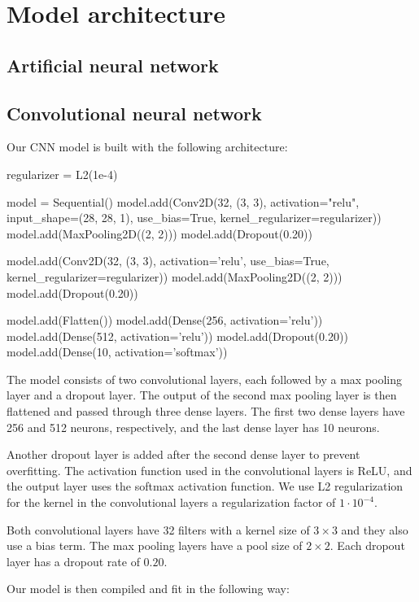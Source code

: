 \section{Model architecture}

\subsection{Artificial neural network}

\subsection{Convolutional neural network}

Our CNN model is built with the following architecture:

\begin{python}
regularizer = L2(1e-4)

model = Sequential()
model.add(Conv2D(32, (3, 3), activation="relu", input_shape=(28, 28, 1), use_bias=True, kernel_regularizer=regularizer))
model.add(MaxPooling2D((2, 2)))
model.add(Dropout(0.20))

model.add(Conv2D(32, (3, 3), activation='relu', use_bias=True, kernel_regularizer=regularizer))
model.add(MaxPooling2D((2, 2)))
model.add(Dropout(0.20))

model.add(Flatten())
model.add(Dense(256, activation='relu'))
model.add(Dense(512, activation='relu'))
model.add(Dropout(0.20))
model.add(Dense(10, activation='softmax'))
\end{python}

The model consists of two convolutional layers, each followed by a max pooling layer and a dropout layer. The output of the second max pooling layer is then flattened and passed through three dense layers. The first two dense layers have 256 and 512 neurons, respectively, and the last dense layer has 10 neurons. 
\par
Another dropout layer is added after the second dense layer to prevent overfitting. The activation function used in the convolutional layers is ReLU, and the output layer uses the softmax activation function. We use L2 regularization for the kernel in the convolutional layers a regularization factor of $1 \cdot 10^{-4}$.
\par
Both convolutional layers have 32 filters with a kernel size of $3 \times 3$ and they also use a bias term. The max pooling layers have a pool size of $2 \times 2$. Each dropout layer has a dropout rate of $0.20$.
\par
Our model is then compiled and fit in the following way:

